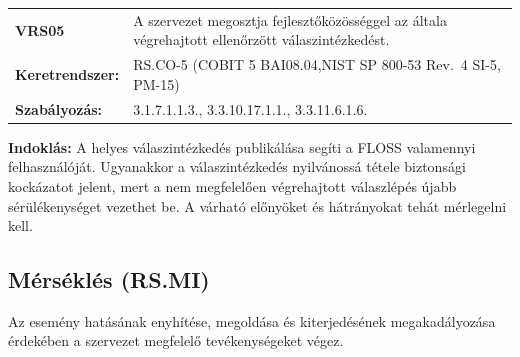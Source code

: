 \documentclass[12pt,magyar,a4paper,oneside]{scrreprt}
\begin{document}
\begin{longtable}[]{@{}ll@{}}
\toprule
\endhead
\begin{minipage}[t]{0.16\columnwidth}\raggedright
\textbf{VRS05}\strut
\end{minipage} & \begin{minipage}[t]{0.79\columnwidth}\raggedright
A szervezet megosztja fejlesztőközösséggel az általa végrehajtott
ellenőrzött válaszintézkedést.\strut
\end{minipage}\tabularnewline
\begin{minipage}[t]{0.16\columnwidth}\raggedright
\textbf{Keretrendszer:}\strut
\end{minipage} & \begin{minipage}[t]{0.79\columnwidth}\raggedright
RS.CO-5 (COBIT 5 BAI08.04,NIST SP 800-53 Rev.~4 SI-5, PM-15)\strut
\end{minipage}\tabularnewline
\begin{minipage}[t]{0.16\columnwidth}\raggedright
\textbf{Szabályozás:}\strut
\end{minipage} & \begin{minipage}[t]{0.79\columnwidth}\raggedright
3.1.7.1.1.3., 3.3.10.17.1.1., 3.3.11.6.1.6.\strut
\end{minipage}\tabularnewline
\bottomrule
\end{longtable}

\textbf{Indoklás: } A helyes válaszintézkedés publikálása segíti a FLOSS
valamennyi felhasználóját. Ugyanakkor a válaszintézkedés nyilvánossá
tétele biztonsági kockázatot jelent, mert a nem megfelelően végrehajtott
válaszlépés újabb sérülékenységet vezethet be. A várható előnyöket és
hátrányokat tehát mérlegelni kell.

\hypertarget{muxe9rsuxe9kluxe9s-rs.mi}{%
\subsection{Mérséklés (RS.MI)}\label{muxe9rsuxe9kluxe9s-rs.mi}}

Az esemény hatásának enyhítése, megoldása és kiterjedésének
megakadályozása érdekében a szervezet megfelelő tevékenységeket végez.
\end{document}

